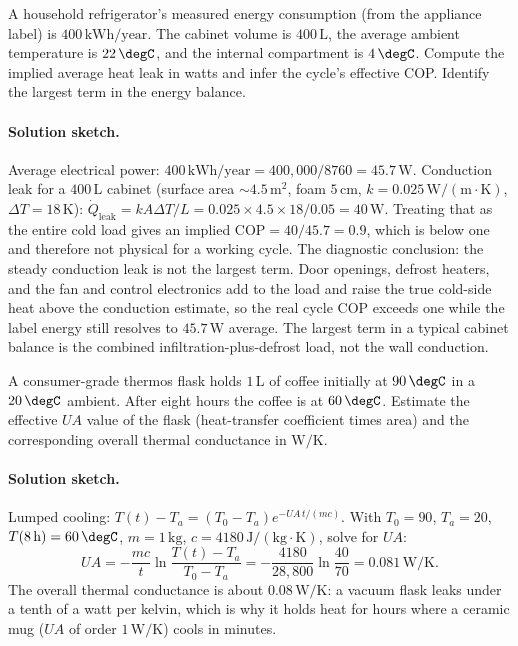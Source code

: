 \begin{exercise}
A household refrigerator's measured energy consumption (from the
appliance label) is $400\,\text{kWh}/\text{year}$. The cabinet
volume is $400\,\text{L}$, the average ambient temperature is
$22\,\degC$, and the internal compartment is $4\,\degC$. Compute the
implied average heat leak in watts and infer the cycle's effective
COP. Identify the largest term in the energy balance.
\paragraph{Solution sketch.} Average electrical power:
$400\,\text{kWh}/\text{year} = 400{,}000/8760 = 45.7\,\text{W}$.
Conduction leak for a $400\,\text{L}$ cabinet (surface area
$\sim 4.5\,\text{m}^2$, foam $5\,\si{\centi\meter}$, $k =
0.025\,\text{W}/(\text{m}\cdot\si{\kelvin})$, $\Delta T = 18\,
\si{\kelvin}$): $\dot{Q}_{\text{leak}} = kA\Delta T/L = 0.025 \times
4.5 \times 18/0.05 = 40\,\text{W}$. Treating that as the entire cold
load gives an implied $\text{COP} = 40/45.7 = 0.9$, which is below one
and therefore not physical for a working cycle. The diagnostic
conclusion: the steady conduction leak is not the largest term. Door
openings, defrost heaters, and the fan and control electronics add to
the load and raise the true cold-side heat above the conduction
estimate, so the real cycle COP exceeds one while the label energy
still resolves to $45.7\,\text{W}$ average. The largest term in a
typical cabinet balance is the combined infiltration-plus-defrost load,
not the wall conduction.
\end{exercise}

\begin{exercise}
A consumer-grade thermos flask holds $1\,\text{L}$ of coffee
initially at $90\,\degC$ in a $20\,\degC$ ambient. After eight hours
the coffee is at $60\,\degC$. Estimate the effective $UA$ value of
the flask (heat-transfer coefficient times area) and the
corresponding overall thermal conductance in $\text{W}/\si{\kelvin}$.
\paragraph{Solution sketch.} Lumped cooling:
$T(t) - T_a = (T_0 - T_a)e^{-UA\,t/(mc)}$. With $T_0 = 90$, $T_a = 20$,
$T(8\,\text{h}) = 60\,\degC$, $m = 1\,\text{kg}$, $c =
4180\,\text{J}/(\text{kg}\cdot\si{\kelvin})$, solve for $UA$:
\[
UA = -\frac{mc}{t}\ln\frac{T(t) - T_a}{T_0 - T_a}
= -\frac{4180}{28{,}800}\ln\frac{40}{70} = 0.081\,\text{W}/\si{\kelvin}.
\]
The overall thermal conductance is about $0.08\,\text{W}/\si{\kelvin}$:
a vacuum flask leaks under a tenth of a watt per kelvin, which is why
it holds heat for hours where a ceramic mug ($UA$ of order
$1\,\text{W}/\si{\kelvin}$) cools in minutes.
\end{exercise}

